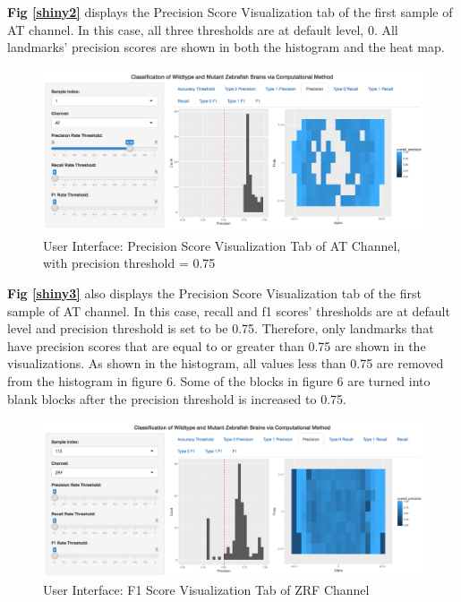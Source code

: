 \documentclass[10pt,letterpaper]{article}
\begin{document}
\textbf{Fig \ref{shiny2}} displays the Precision Score Visualization tab
of the first sample of AT channel. In this case, all three thresholds
are at default level, 0. All landmarks' precision scores are shown in
both the histogram and the heat map.

\begin{figure}[h]

{\centering \includegraphics[width=4.9in]{figures/shiny3} 

}

\caption{\label{shiny3} User Interface: Precision Score Visualization Tab of AT Channel, with precision threshold = 0.75}\label{fig:unnamed-chunk-12}
\end{figure}

\textbf{Fig \ref{shiny3}} also displays the Precision Score
Visualization tab of the first sample of AT channel. In this case,
recall and f1 scores' thresholds are at default level and precision
threshold is set to be 0.75. Therefore, only landmarks that have
precision scores that are equal to or greater than 0.75 are shown in the
visualizations. As shown in the histogram, all values less than 0.75 are
removed from the histogram in figure 6. Some of the blocks in figure 6
are turned into blank blocks after the precision threshold is increased
to 0.75.

\begin{figure}[h]

{\centering \includegraphics[width=5.04in]{figures/shiny8} 

}

\caption{\label{shiny4} User Interface: F1 Score Visualization Tab of ZRF Channel}\label{fig:unnamed-chunk-13}
\end{figure}
\end{document}
